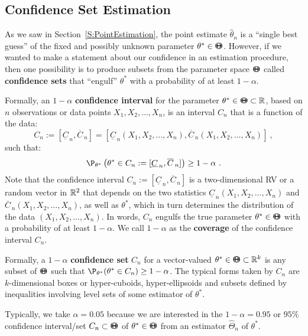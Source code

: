 \subsection{Confidence Set Estimation}\label{S:ConfidenceSets}
As we saw in Section~\ref*{S:PointEstimation}, the point estimate $\widehat{\theta}_n$ is a ``single best guess'' of  the fixed and possibly unknown parameter $\theta^* \in {\Theta}\mspace{-11 mu}{\Theta}$.  However, if we wanted to make a statement about our confidence in an estimation procedure, then one possibility is to produce subsets from the parameter space ${\Theta}\mspace{-11 mu}{\Theta}$ called {\bf confidence sets} that ``engulf'' $\theta^*$ with a probability of at least $1-\alpha$.  

Formally, an $1-\alpha$ {\bf confidence interval} for the parameter $\theta^* \in {\Theta}\mspace{-11 mu}{\Theta} \subset \mathbb{R}$, based on $n$ observations or data points $X_1,X_2,\ldots,X_n$, is an interval $C_n$ that is a function of the data:
\[
C_n := [\underline{C}_{\, n}, \overline{C}_{\, n}]
= [\underline{C}_{\, n}(X_1,X_2,\ldots,X_n), \overline{C}_{\, n}(X_1,X_2,\ldots,X_n)] \ ,
\]
such that:
\[
\P_{\theta^*} \left(  \theta^* \in C_n :=  [\underline{C}_{\, n}, \overline{C}_{\, n}] \right) \geq 1-\alpha \ .
\]
Note that the confidence interval $C_n := [\underline{C}_{\, n}, \overline{C}_{\, n}]$ is a two-dimensional RV or a random vector in $\mathbb{R}^2$ that depends on the two statistics $\underline{C}_{\, n} (X_1,X_2,\ldots,X_n) $ and $\overline{C}_{\, n} (X_1,X_2,\ldots,X_n) $, as well as $\theta^*$, which in turn determines the distribution of the data $(X_1,X_2,\ldots,X_n)$.  In words, $C_n$ engulfs the true parameter $\theta^* \in {\Theta}\mspace{-11 mu}{\Theta}$ with a probability of at least $1-\alpha$.  We call $1-\alpha$ as the {\bf coverage} of the confidence interval $C_n$.

Formally, a $1-\alpha$ {\bf confidence set} $C_n$ for a vector-valued $\theta^* \in {\Theta}\mspace{-11 mu}{\Theta} \subset \mathbb{R}^k$ is any subset of ${\Theta}\mspace{-11 mu}{\Theta}$ such that $\P_{\theta^*}( \theta^* \in C_n) \geq 1-\alpha$.  The typical forms taken by $C_n$ are $k$-dimensional boxes or hyper-cuboids, hyper-ellipsoids and subsets defined by inequalities involving level sets of some estimator of $\theta^*$.  

Typically, we take $\alpha=0.05$ because we are interested in the $1-\alpha=0.95$ or $95\%$ confidence interval/set $C_n \subset {\Theta}\mspace{-11 mu}{\Theta}$ of $\theta^* \in {\Theta}\mspace{-11 mu}{\Theta}$ from an estimator $\widehat{\Theta}_n$ of $\theta^*$.  

